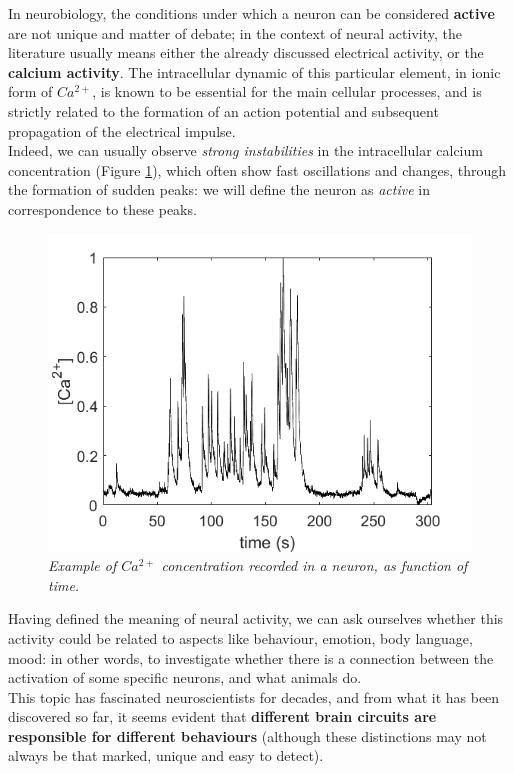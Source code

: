 \documentclass[12pt, a4paper]{article}
\begin{document}
In neurobiology, the conditions under which a neuron can be considered \textbf{active} are not unique and matter of debate; in the context of neural activity, the literature usually means either the already discussed electrical activity, or the \textbf{calcium activity}. The intracellular dynamic of this particular element, in ionic form of $Ca^{2+}$, is known to be essential for the main cellular processes, and is strictly related to the formation of an action potential and subsequent propagation of the electrical impulse.\\
 Indeed, we can usually observe  \textit{strong instabilities} in the intracellular calcium concentration (Figure \ref{oscillations}), which often show fast oscillations and changes, through the formation of sudden peaks: we will define the neuron as \textit{active} in correspondence to these peaks.

\begin{figure}[H]
	\begin{center}
		\includegraphics[scale=.50]{Ca_conc.png} 
	\end{center} 
	\caption{\textit{Example of $Ca^{2+}$ concentration recorded in a neuron, as function of time.}} \label{oscillations}
		
	\end{figure}
	
	Having defined the meaning of neural activity, we can ask ourselves whether this activity could be related to aspects like behaviour, emotion, body language, mood: in other words, to investigate whether there is a connection between the activation of some specific neurons, and what animals do.\\
	This topic has fascinated neuroscientists for decades, and from what it has been discovered so far, it seems evident that \textbf{different brain circuits are responsible for different behaviours} (although these distinctions may not always be that marked, unique and easy to detect).
\end{document}
